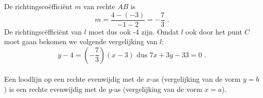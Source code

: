 \begin{voorbeeld}
De richtingsco\"effici\"ent $m$ van rechte $AB$ is
\[
m=\frac {4-(-3)}{-1-2}=-\frac {7}{3} \text { .}
\]
De richtingsc\"effici\"ent van $l$ moet dus ook -4 zijn.
Omdat $l$ ook door het punt $C$ moet gaan bekomen we volgende vergelijking van $l$:
\[
y-4=(-\frac {7}{3})(x-3) \text { dus } 7x+3y-33=0 \text { .}
\]\\

Een loodlijn op een rechte evenwijdig met de $x$-as (vergelijking van de vorm $y=b$) is een rechte evenwijdig met de $y$-as (vergelijking van de vorm $x=a$).
\end{voorbeeld}

